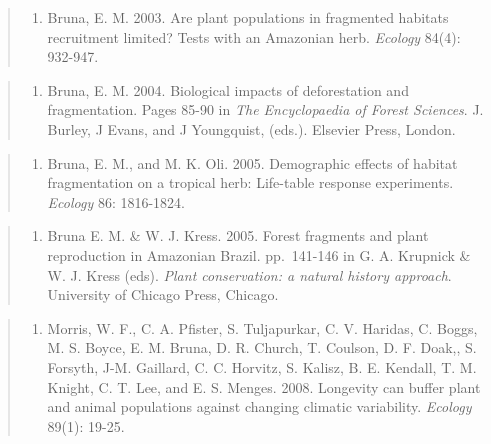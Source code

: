 \documentclass[
  12pt,
  man, donotrepeattitle,floatsintext]{apa6}
\providecommand{\tightlist}{%
  \setlength{\itemsep}{0pt}\setlength{\parskip}{0pt}}
\begin{document}
\begin{quote}
\begin{enumerate}
\def\labelenumi{\arabic{enumi}.}
\setcounter{enumi}{3}
\tightlist
\item
  Bruna, E. M. 2003. Are plant populations in fragmented habitats recruitment limited? Tests with an Amazonian herb. \emph{Ecology} 84(4): 932-947.
\end{enumerate}
\end{quote}

\begin{quote}
\begin{enumerate}
\def\labelenumi{\arabic{enumi}.}
\setcounter{enumi}{4}
\tightlist
\item
  Bruna, E. M. 2004. Biological impacts of deforestation and fragmentation. Pages 85-90 in \emph{The Encyclopaedia of Forest Sciences}. J. Burley, J Evans, and J Youngquist, (eds.). Elsevier Press, London.
\end{enumerate}
\end{quote}

\begin{quote}
\begin{enumerate}
\def\labelenumi{\arabic{enumi}.}
\setcounter{enumi}{5}
\tightlist
\item
  Bruna, E. M., and M. K. Oli. 2005. Demographic effects of habitat fragmentation on a tropical herb: Life-table response experiments. \emph{Ecology} 86: 1816-1824.
\end{enumerate}
\end{quote}

\begin{quote}
\begin{enumerate}
\def\labelenumi{\arabic{enumi}.}
\setcounter{enumi}{6}
\tightlist
\item
  Bruna E. M. \& W. J. Kress. 2005. Forest fragments and plant reproduction in Amazonian Brazil. pp.~141-146 in G. A. Krupnick \& W. J. Kress (eds). \emph{Plant conservation: a natural history approach}. University of Chicago Press, Chicago.
\end{enumerate}
\end{quote}

\begin{quote}
\begin{enumerate}
\def\labelenumi{\arabic{enumi}.}
\setcounter{enumi}{7}
\tightlist
\item
  Morris, W. F., C. A. Pfister, S. Tuljapurkar, C. V. Haridas, C. Boggs, M. S. Boyce, E. M. Bruna, D. R. Church, T. Coulson, D. F. Doak,, S. Forsyth, J-M. Gaillard, C. C. Horvitz, S. Kalisz, B. E. Kendall, T. M. Knight, C. T. Lee, and E. S. Menges. 2008. Longevity can buffer plant and animal populations against changing climatic variability. \emph{Ecology} 89(1): 19-25.
\end{enumerate}
\end{quote}
\end{document}
